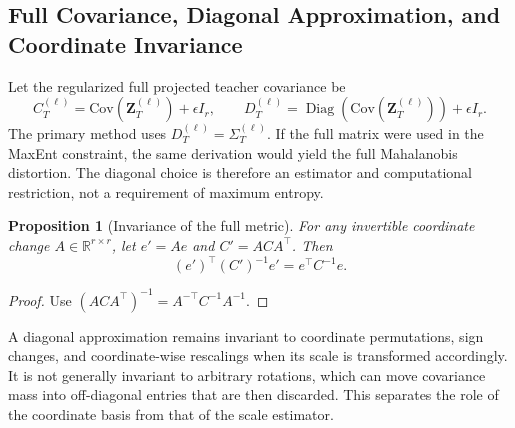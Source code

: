 \documentclass{article}
\newcommand{\R}{\mathbb{R}}
\newcommand{\Cov}{\mathrm{Cov}}
\newcommand{\Diag}{\operatorname{Diag}}
\newcommand{\bSigma}{\varSigma}
\newcommand{\bI}{I}
\theoremstyle{plain}
\newtheorem{proposition}[theorem]{Proposition}
\theoremstyle{definition}
\theoremstyle{remark}
\begin{document}
\subsection{Full Covariance, Diagonal Approximation, and Coordinate Invariance}
\label{app:covariance-approximation}

Let the regularized full projected teacher covariance be
\begin{equation}
  C_T^{(\ell)}=\Cov(\boldsymbol Z_T^{(\ell)})+\epsilon\bI_r,
  \qquad
  D_T^{(\ell)}=\Diag\!\left(\Cov(\boldsymbol Z_T^{(\ell)})\right)
  +\epsilon\bI_r.
  \label{eq:app-full-diag-cov}
\end{equation}
The primary method uses $D_T^{(\ell)}=\bSigma_T^{(\ell)}$.  If the full matrix
were used in the MaxEnt constraint, the same derivation would yield the full
Mahalanobis distortion.  The diagonal choice is therefore an estimator and
computational restriction, not a requirement of maximum entropy.

\begin{proposition}[Invariance of the full metric]
\label{prop:app-full-metric-invariance}
For any invertible coordinate change $A\in\R^{r\times r}$, let
$e'=Ae$ and $C'=ACA^\top$.  Then
\begin{equation}
  (e')^\top(C')^{-1}e'=e^\top C^{-1}e.
  \label{eq:app-full-invariance}
\end{equation}
\end{proposition}

\begin{proof}
Use $(ACA^\top)^{-1}=A^{-\top}C^{-1}A^{-1}$.
\end{proof}

A diagonal approximation remains invariant to coordinate permutations, sign
changes, and coordinate-wise rescalings when its scale is transformed accordingly.
It is not generally invariant to arbitrary rotations, which can move covariance
mass into off-diagonal entries that are then discarded.  This separates the role
of the coordinate basis from that of the scale estimator.
\end{document}
